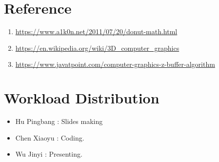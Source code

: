 \documentclass{article}
\begin{document}
\section{Reference}

\begin{enumerate}
  \item \url{https://www.a1k0n.net/2011/07/20/donut-math.html}
  \item \url{https://en.wikipedia.org/wiki/3D_computer_graphics}
  \item \url{https://www.javatpoint.com/computer-graphics-z-buffer-algorithm}
\end{enumerate}

\section{Workload Distribution}
  \begin{itemize}
    \item Hu Pingbang : Slides making
    \item Chen Xiaoyu : Coding.
    \item Wu Jinyi : Presenting.
  \end{itemize}
\end{document}
